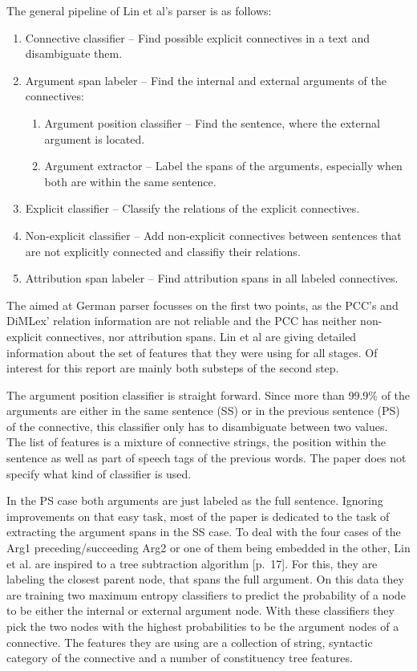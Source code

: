 \documentclass[10pt,a4paper]{article}
\begin{document}
The general pipeline of Lin et al's parser is as follows:
\begin{enumerate}
\item Connective classifier -- Find possible explicit connectives in a text and disambiguate them.
\item Argument span labeler -- Find the internal and external arguments of the connectives:
	\begin{enumerate}
	\item Argument position classifier -- Find the sentence, where the external argument is located.
	\item Argument extractor -- Label the spans of the arguments, especially when both are within the 									same sentence.
	\end{enumerate}
\item Explicit classifier -- Classify the relations of the explicit connectives.
\item Non-explicit classifier -- Add non-explicit connectives between sentences that are not explicitly connected and classifiy their relations.
\item Attribution span labeler -- Find attribution spans in all labeled connectives.
\end{enumerate}

The aimed at German parser focusses on the first two points, as the PCC's and DiMLex' relation information are not reliable and the PCC has neither non-explicit connectives, nor attribution spans. Lin et al are giving detailed information about the set of features that they were using for all stages. Of interest for this report are mainly both substeps of the second step.

The argument position classifier is straight forward. Since more than 99.9\% of the arguments are either in the same sentence (SS) or in the previous sentence (PS) of the connective, this classifier only has to disambiguate between two values. The  list of features is a mixture of connective strings, the position within the sentence as well as part of speech tags of the previous words. The paper does not specify what kind of classifier is used.

In the PS case both arguments are just labeled as the full sentence. Ignoring improvements on that easy task, most of the paper is dedicated to the task of extracting the argument spans in the SS case.  To deal with the four cases of the Arg1 preceding/succeeding Arg2 or one of them being embedded in the other, Lin et al. are inspired to a tree subtraction algorithm \cite{Lin12}[p.~17]. For this, they are labeling the closest parent node, that spans the full argument. On this data they are training two maximum entropy classifiers to predict the probability of a node to be either the internal or external argument node. With these classifiers they pick the two nodes with the highest probabilities to be the argument nodes of a connective. The features they are using are a collection of string, syntactic category of the connective and a number of constituency tree features.
\end{document}
